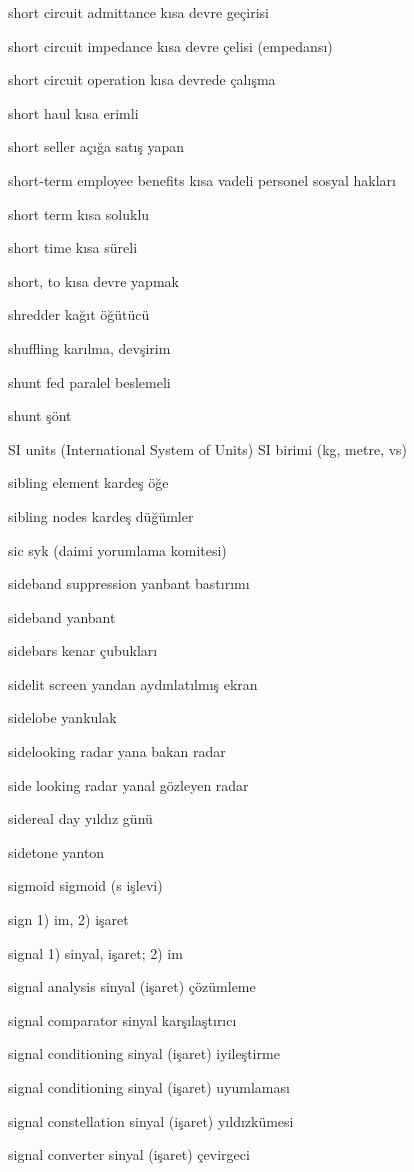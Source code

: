 \documentclass[12pt,fleqn]{article}\usepackage{../../common}
\begin{document}
short circuit admittance kısa devre geçirisi

short circuit impedance kısa devre çelisi (empedansı)

short circuit operation kısa devrede çalışma

short haul kısa erimli

short seller açığa satış yapan

short-term employee benefits kısa vadeli personel sosyal hakları

short term kısa soluklu

short time kısa süreli

short, to kısa devre yapmak

shredder kağıt öğütücü

shuffling karılma, devşirim

shunt fed paralel beslemeli

shunt şönt

SI units (International System of Units) SI birimi (kg, metre, vs)

sibling element kardeş öğe

sibling nodes kardeş düğümler

sic syk (daimi yorumlama komitesi)

sideband suppression yanbant bastırımı

sideband yanbant

sidebars kenar çubukları

sidelit screen yandan aydınlatılmış ekran

sidelobe yankulak

sidelooking radar yana bakan radar

side looking radar yanal gözleyen radar

sidereal day yıldız günü

sidetone yanton

sigmoid sigmoid (s işlevi)

sign 1) im, 2) işaret

signal 1) sinyal, işaret; 2) im

signal analysis sinyal (işaret) çözümleme

signal comparator sinyal karşılaştırıcı

signal conditioning sinyal (işaret) iyileştirme

signal conditioning sinyal (işaret) uyumlaması

signal constellation sinyal (işaret) yıldızkümesi

signal converter sinyal (işaret) çevirgeci
\end{document}
